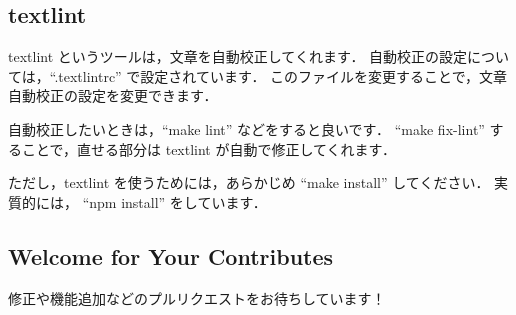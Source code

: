 \subsection{textlint}

textlint というツールは，文章を自動校正してくれます．
自動校正の設定については，``.textlintrc'' で設定されています．
このファイルを変更することで，文章自動校正の設定を変更できます．

自動校正したいときは，``make lint'' などをすると良いです．
``make fix-lint'' することで，直せる部分は textlint が自動で修正してくれます．

ただし，textlint を使うためには，あらかじめ ``make install'' してください．
実質的には， ``npm install'' をしています．

\subsection{Welcome for Your Contributes}

修正や機能追加などのプルリクエストをお待ちしています！

